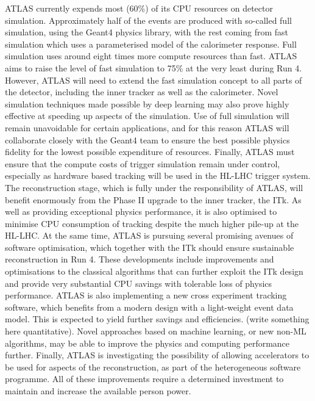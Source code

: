 ATLAS currently expends most (60\%) of its CPU resources on detector simulation. Approximately half of the events are produced with so-called full simulation, using the Geant4 physics library, with the rest coming from fast simulation which uses a parameterised model of the calorimeter response. Full simulation uses around eight times more compute resources than fast. ATLAS aims to raise the level of fast simulation to 75\% at the very least during Run 4. However, ATLAS will need to extend the fast simulation concept to all parts of the detector, including the inner tracker as well as the calorimeter. Novel simulation techniques made possible by deep learning may also prove highly effective at speeding up aspects of the simulation. Use of full simulation will remain unavoidable for certain applications, and for this reason ATLAS will collaborate closely with the Geant4 team to ensure the best possible physics fidelity for the lowest possible expenditure of resources. Finally, ATLAS must ensure that the compute costs of trigger simulation remain under control, especially as hardware based tracking will be used in the HL-LHC trigger system. \\

The reconstruction stage, which is fully under the responsibility of ATLAS, will benefit enormously from the Phase II upgrade to the inner tracker, the ITk. As well as providing exceptional physics performance, it is also optimised to minimise CPU consumption of tracking despite the much higher pile-up at the HL-LHC. At the same time, ATLAS is pursuing several promising avenues of software optimisation, which together with the ITk should ensure sustainable reconstruction in Run 4. These developments include improvements and optimisations to the classical algorithms that can further exploit the ITk design and provide very substantial CPU savings with tolerable loss of physics performance. ATLAS is also implementing a new cross experiment tracking software, which benefits from a modern design with a light-weight event data model. This is expected to yield further savings and efficiencies. (write something here quantitative). Novel approaches based on machine learning, or new non-ML algorithms, may be able to improve the physics and computing performance further. Finally, ATLAS is investigating the possibility of allowing accelerators to be used for aspects of the reconstruction, as part of the heterogeneous software programme. All of these improvements require a determined investment to maintain and increase the available person power. \\

